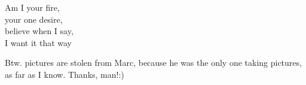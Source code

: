 \begin{post}
\begin{content}
\begin{blockquote}Am I your fire,\\
your one desire,\\
believe when I say,\\
I want it that way\end{blockquote}


Btw. pictures are stolen from Marc, because he was the only one taking pictures, as far as I know. Thanks, man!:)
	\end{content}
\end{post}
